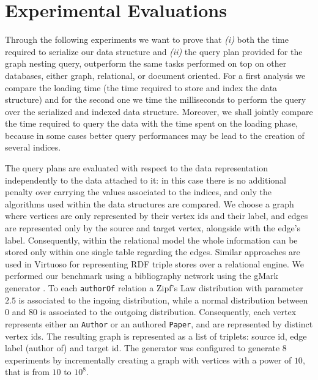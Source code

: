 \section{Experimental Evaluations}\label{sec:nestexpeval}
Through the following experiments we want to prove that \textit{(i)} both the time required to serialize our data structure and \textit{(ii)} the query plan provided for the graph nesting query,  outperform the same tasks performed on top on other databases, either graph, relational, or document oriented. For a first analysis we compare the loading time (the time required to store and index the data structure) and for the second one we time the milliseconds to perform the query  over the serialized and indexed data structure. Moreover, we shall jointly compare the time required to query the data with the time spent on the loading phase, because in some cases better query performances may be lead to the creation of several indices.


The query plans are evaluated with respect to the data representation independently to the data attached to it: in this case there is no additional penalty over carrying the values associated to the indices, and only the algorithms used within the data structures are compared. We choose a graph where vertices are only represented by their vertex ids and their label, and edges are represented only by the source and target vertex, alongside with the edge's label. Consequently, within the relational model the whole information can be stored only within one single table regarding the edges. Similar approaches are used in Virtuoso for representing RDF triple stores over a relational engine. We performed our benchmark using  a bibliography network using the gMark generator \cite{BBCFLA17}. To each \texttt{authorOf} relation a Zipf's Law distribution with parameter $2.5$ is associated to the ingoing distribution, while a normal distribution between $0$ and $80$ is associated to the outgoing distribution. Consequently, each vertex represents either an \texttt{Author} or an authored \texttt{Paper}, and are represented by distinct vertex ids. The resulting graph is represented as a list of triplets: source id, edge label (author of) and target id. The generator was configured to generate $8$ experiments by incrementally creating a graph with vertices with a power of $10$, that is from $10$ to $10^8$.

